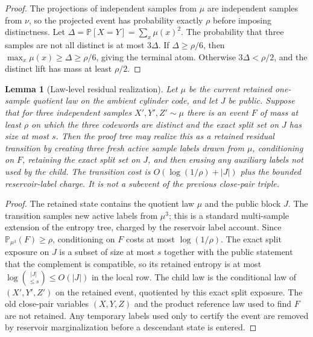\documentclass[11pt]{article}
\newtheorem{lemma}[theorem]{Lemma}
\theoremstyle{remark}
\newcommand{\Prob}{\mathbb P}
\begin{document}
\begin{proof}
The projections of independent samples from $\mu$ are independent samples from $\nu$, so the projected event has probability exactly $\rho$ before imposing distinctness.  Let $\Delta=\Prob[X=Y]=\sum_x\mu(x)^2$.  The probability that three samples are not all distinct is at most $3\Delta$.  If $\Delta\ge\rho/6$, then $\max_x\mu(x)\ge\Delta\ge\rho/6$, giving the terminal atom.  Otherwise $3\Delta<\rho/2$, and the distinct lift has mass at least $\rho/2$.
\end{proof}

\begin{lemma}[Law-level residual realization]\label{lem:law-level-realization}
Let $\mu$ be the current retained one-sample quotient law on the ambient
cylinder code, and let $J$ be public.  Suppose that for three independent
samples $X',Y',Z'\sim\mu$ there is an event $F$ of mass at least $\rho$ on
which the three codewords are distinct and the exact split set on $J$ has size
at most $s$.  Then the proof tree may realize this as a retained residual
transition by creating three fresh active sample labels drawn from $\mu$,
conditioning on $F$, retaining the exact split set on $J$, and then erasing any
auxiliary labels not used by the child.  The transition cost is
$O(\log(1/\rho)+|J|)$ plus the bounded reservoir-label charge.  It is not a
subevent of the previous close-pair triple.
\end{lemma}

\begin{proof}
The retained state contains the quotient law $\mu$ and the public block $J$.
The transition samples new active labels from $\mu^3$; this is a standard
multi-sample extension of the entropy tree, charged by the reservoir label
account.  Since $\Prob_{\mu^3}(F)\ge\rho$, conditioning on $F$ costs at most
$\log(1/\rho)$.  The exact split exposure on $J$ is a subset of size at most
$s$ together with the public statement that the complement is compatible, so
its retained entropy is at most $\log\binom{|J|}{\le s}\le O(|J|)$ in the
local row.  The child law is the
conditional law of $(X',Y',Z')$ on the retained event, quotiented by this exact
split exposure.  The old close-pair variables $(X,Y,Z)$ and the product
reference law used to find $F$ are not retained.  Any temporary labels used only
to certify the event are removed by reservoir marginalization before a
descendant state is entered.
\end{proof}
\end{document}
